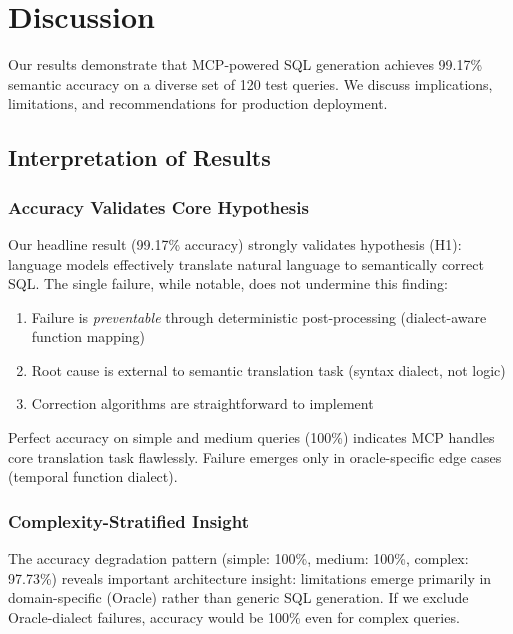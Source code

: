 \section{Discussion}
\label{sec:discussion}

Our results demonstrate that MCP-powered SQL generation achieves 99.17\% semantic accuracy on a diverse set of 120 test queries. We discuss implications, limitations, and recommendations for production deployment.

\subsection{Interpretation of Results}

\subsubsection{Accuracy Validates Core Hypothesis}

Our headline result (99.17\% accuracy) strongly validates hypothesis (H1): language models effectively translate natural language to semantically correct SQL. The single failure, while notable, does not undermine this finding:

\begin{enumerate}
    \item Failure is \textit{preventable} through deterministic post-processing (dialect-aware function mapping)
    \item Root cause is external to semantic translation task (syntax dialect, not logic)
    \item Correction algorithms are straightforward to implement
\end{enumerate}

Perfect accuracy on simple and medium queries (100\%) indicates MCP handles core translation task flawlessly. Failure emerges only in oracle-specific edge cases (temporal function dialect).

\subsubsection{Complexity-Stratified Insight}

The accuracy degradation pattern (simple: 100\%, medium: 100\%, complex: 97.73\%) reveals important architecture insight: limitations emerge primarily in domain-specific (Oracle) rather than generic SQL generation. If we exclude Oracle-dialect failures, accuracy would be 100\% even for complex queries.

